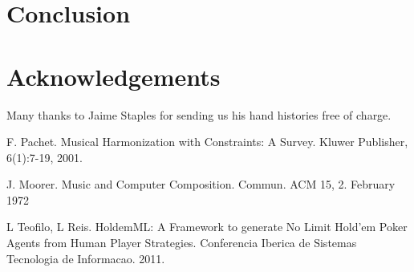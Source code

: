 \documentclass[twoside]{article}
\begin{document}
\begin{multicols}{2}

\section{Conclusion}


\section{Acknowledgements}

Many thanks to Jaime Staples for sending us his hand histories free of charge. 


\begin{thebibliography}{99} %
 F. Pachet. Musical Harmonization with Constraints: A Survey. Kluwer Publisher, 6(1):7-19, 2001.

 J. Moorer. Music and Computer Composition. Commun. ACM 15, 2. February 1972

 L Teofilo, L Reis. HoldemML: A Framework to generate No Limit Hold’em Poker Agents from Human Player Strategies. Conferencia Iberica de Sistemas Tecnologia de Informacao. 2011.

\end{thebibliography}


\end{multicols}
\end{document}
